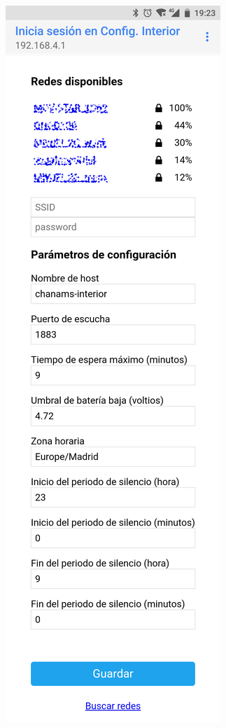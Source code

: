 \begin{figure}
\begin{subfigure}{0.49\columnwidth}
  \centering
  \includegraphics[height=0.94\textheight,frame]{images/interior-config}

\end{subfigure}
\end{figure}
